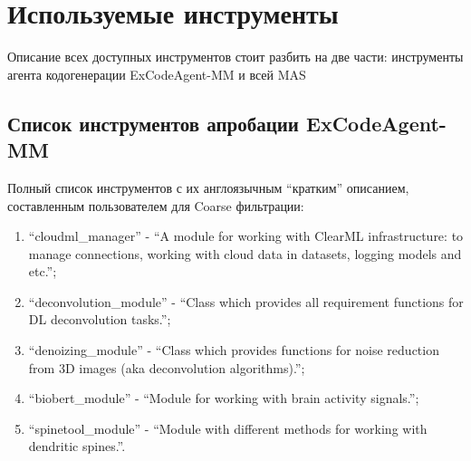 \chapter{Используемые инструменты}\label{appendix-tools}							%

Описание всех доступных инструментов стоит разбить на две части: инструменты агента 
кодогенерации ExCodeAgent-MM и всей MAS 

\section{Список инструментов апробации ExCodeAgent-MM}\label{appendix-tools:sec1}

Полный список инструментов с их англоязычным ``кратким'' описанием, составленным пользователем для 
Coarse фильтрации:
\begin{enumerate}
	\item ``cloudml\_manager'' - ``A module for working with ClearML infrastructure: 
to manage connections, working with cloud data in datasets, logging models and etc.'';
	\item ``deconvolution\_module'' - ``Class which provides all requirement functions for DL deconvolution tasks.'';
	\item ``denoizing\_module'' - ``Class which provides functions for noise reduction from 3D images 
(aka deconvolution algorithms).'';
	\item ``biobert\_module'' - ``Module for working with brain activity signals.'';
	\item ``spinetool\_module'' - ``Module with different methods for working with dendritic spines.''.
\end{enumerate}

